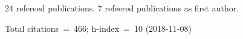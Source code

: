 24 refereed publications. 7 refeered publications as first author.

Total citations~=~466; h-index~=~10 (2018-11-08)